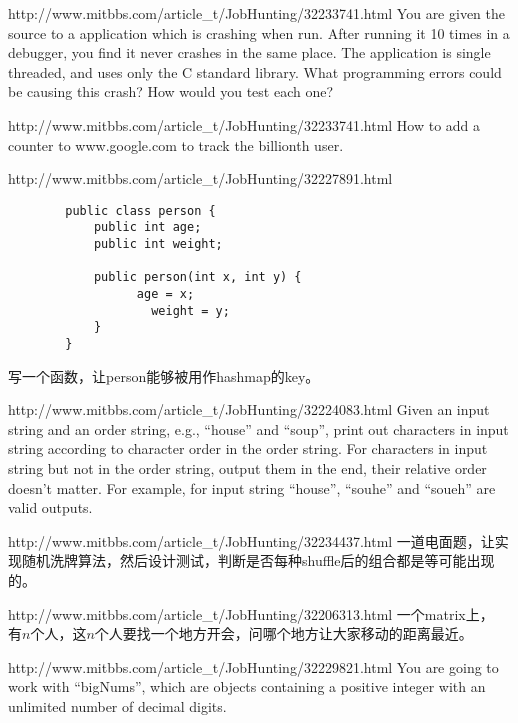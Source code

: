\documentclass[a4paper]{article}
\begin{document}
\begin{CJK}{UTF8}{gbsn}
\begin{enumerate}
\begin{Q}[Google]{http://www.mitbbs.com/article_t/JobHunting/32233741.html}
You are given the source to a application which is crashing when run. After running it 10 times in a debugger, you find it never crashes in the same place. The application is single threaded, and uses only the C standard library. What programming errors could be causing this crash? How would you test each one?
\end{Q}

\begin{Q}[Google]{http://www.mitbbs.com/article_t/JobHunting/32233741.html}
How to add a counter to www.google.com to track the billionth user.
\end{Q}

\begin{Q}[Google]{http://www.mitbbs.com/article_t/JobHunting/32227891.html}
	\begin{lstlisting}
		public class person {
			public int age;
			public int weight;

			public person(int x, int y) {
				  age = x;
				    weight = y;
			}
		}
	\end{lstlisting}
写一个函数，让person能够被用作hashmap的key。
\end{Q}

\begin{Q}[Google]{http://www.mitbbs.com/article_t/JobHunting/32224083.html}
Given an input string and an order string, e.g., ``house'' and ``soup'', print out characters in input string according to character order in the order string. For characters in input string but not in the order string, output them in the end, their relative order doesn't matter. For example, for input string ``house'', ``souhe'' and ``soueh'' are valid outputs.
\end{Q}

\begin{Q}{http://www.mitbbs.com/article_t/JobHunting/32234437.html}
一道电面题，让实现随机洗牌算法，然后设计测试，判断是否每种shuffle后的组合都是等可能出现的。
\end{Q}

\begin{Q}[Google]{http://www.mitbbs.com/article_t/JobHunting/32206313.html}
一个matrix上， 有$n$个人，这$n$个人要找一个地方开会，问哪个地方让大家移动的距离最近。
\end{Q}

\begin{Q}[Google]{http://www.mitbbs.com/article_t/JobHunting/32229821.html}
You are going to work with “bigNums”, which are objects containing a positive integer with an unlimited number of decimal digits.


\end{Q}
\end{enumerate}
\end{CJK}
\end{document}
